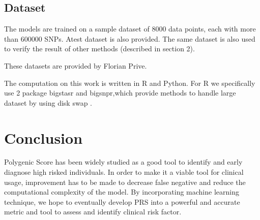 \documentclass{article}
\begin{document}
\subsection{}


\subsection{Dataset}

The models are trained on a sample dataset of 8000 data points, each with more than 
$600000$ SNPs. Atest dataset is also provided. The same dataset is also used to verify 
the result of other methods (described in section 2).

These datasets are provided by Florian Prive.

The computation on this work is written in R and Python. For R we specifically use 2 
package bigstasr and bigsnpr,which provide methods to handle large dataset by using disk 
swap \cite{bigsnpr}.

\section{Conclusion}

Polygenic Score has been widely studied as a good tool to identify and early
diagnose high risked individuals. In order to make it a viable tool for clinical usage,
improvement has to be made to decrease false negative and reduce the computational
complexity of the model. By incorporating machine learning technique, we hope to
eventually develop PRS into a powerful and accurate metric and tool to assess
and identify clinical risk factor.



\end{document}
